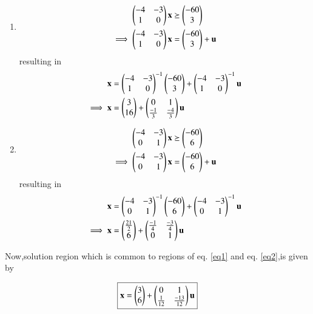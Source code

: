 \documentclass[journal,12pt,twocolumn]{IEEEtran}
\begin{document}
\begin{enumerate}
    \item 
    \begin{align}
        \begin{pmatrix}-4 & -3 \\ 1 & 0\end{pmatrix}\mathbf{x} &\succeq \begin{pmatrix}-60 \\ 3\end{pmatrix}
        \\
        \implies  \begin{pmatrix}-4 & -3 \\ 1 & 0\end{pmatrix}\mathbf{x} &= \begin{pmatrix}-60 \\ 3\end{pmatrix} + \mathbf{u}
    \end{align}
    resulting in 
    \begin{align}
        \mathbf{x} &= \begin{pmatrix}-4 & -3 \\1 & 0\end{pmatrix}^{-1}\begin{pmatrix}-60 \\ 3\end{pmatrix} + \begin{pmatrix}-4 & -3 \\1 & 0\end{pmatrix}^{-1}\mathbf{u}
        \\
        \implies \mathbf{x} &= \begin{pmatrix}3 \\16\end{pmatrix} + \begin{pmatrix}0 & 1\\ \frac{-1}{3} & \frac{-4}{3}\end{pmatrix}\mathbf{u}   \label{eq1}
    \end{align}

    \item 
    \begin{align}
        \begin{pmatrix}-4 & -3 \\ 0 & 1\end{pmatrix}\mathbf{x} &\succeq \begin{pmatrix}-60 \\ 6\end{pmatrix}
        \\
        \implies  \begin{pmatrix}-4 & -3 \\ 0 & 1\end{pmatrix}\mathbf{x} &= \begin{pmatrix}-60 \\ 6\end{pmatrix} + \mathbf{u}
    \end{align}
    resulting in 
    \begin{align}
        \mathbf{x} &= \begin{pmatrix}-4 & -3 \\0 & 1\end{pmatrix}^{-1}\begin{pmatrix}-60 \\ 6\end{pmatrix} + \begin{pmatrix}-4 & -3 \\0 & 1\end{pmatrix}^{-1}\mathbf{u}
        \\
        \implies \mathbf{x} &= \begin{pmatrix}\frac{21}{2} \\6\end{pmatrix} + \begin{pmatrix}\frac{-1}{4} & \frac{-3}{4}\\ 0 & 1\end{pmatrix}\mathbf{u} \label{eq2}
    \end{align}
\end{enumerate}

Now,solution region which is common to regions of eq. \eqref{eq1} and eq. \eqref{eq2},is given by

\begin{align}
    \boxed{\mathbf{x} = \begin{pmatrix}3 \\ 6\end{pmatrix}+\begin{pmatrix}0 & 1\\\frac{1}{12} & \frac{-13}{12}\end{pmatrix}\mathbf{u}}
\end{align}
\end{document}
